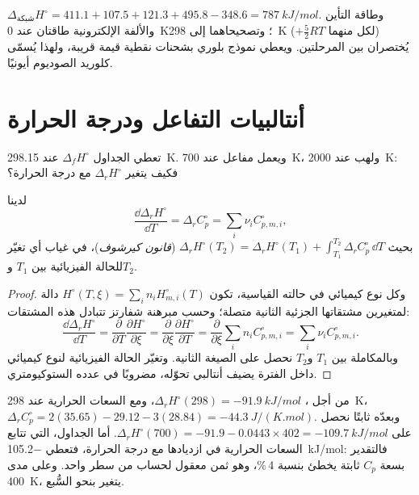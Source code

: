 \begin{example}\label{ex:b2:reaction-enthalpy:nacl}
$\Delta_{\text{شبكة}}H^\circ = 411.1 + 107.5 + 121.3 + 495.8 - 348.6 =
\qty{787}{kJ/mol}$. وطاقة التأين والألفة الإلكترونية طاقتان عند
\qty{0}{K}؛ وتصحيحاهما إلى \qty{298}{K} ($+\tfrac52RT$ لكل منهما)
يُختصران بين المرحلتين. ويعطي نموذج بلوري بشحنات نقطية قيمة قريبة، ولهذا
يُسمّى كلوريد الصوديوم أيونيًا.
\end{example}

\section{أنتالبيات التفاعل ودرجة الحرارة}

تعطي الجداول $\Delta_f H^\circ$ عند \qty{298.15}{K}. ويعمل مفاعل عند
\qty{700}{K}، ولهب عند \qty{2000}{K}: فكيف يتغير $\Delta_r H^\circ$ مع
درجة الحرارة؟

\begin{theorem}\label{thm:b2:reaction-enthalpy:kirchhoff}
لدينا
\[
  \frac{\dd\Delta_r H^\circ}{\dd T} = \Delta_r C_p^\circ =
  \sum_i\nu_i C_{p,m,i}^\circ ,
\]
بحيث $\Delta_r H^\circ(T_2) = \Delta_r H^\circ(T_1) + \int_{T_1}^{T_2}
\Delta_r C_p^\circ\,\dd T$ (\emph{قانون كيرشوف})،
في غياب أي تغيّر للحالة الفيزيائية بين $T_1$ و$T_2$.
\end{theorem}

\begin{proof}
وكل نوع كيميائي في حالته القياسية، تكون $H^\circ(T, \xi) = \sum_in_i
H^\circ_{m,i}(T)$ دالة لمتغيرين مشتقاتها الجزئية الثانية متصلة؛ وحسب
مبرهنة شفارتز تتبادل هذه المشتقات:
\[
  \frac{\dd\Delta_r H^\circ}{\dd T} = \frac{\partial}{\partial T}
  \frac{\partial H^\circ}{\partial\xi} = \frac{\partial}{\partial\xi}
  \frac{\partial H^\circ}{\partial T} = \frac{\partial}{\partial\xi}
  \sum_in_iC^\circ_{p,m,i} = \sum_i\nu_iC^\circ_{p,m,i}.
\]
وبالمكاملة بين $T_1$ و$T_2$ نحصل على الصيغة الثانية. وتغيّر الحالة
الفيزيائية لنوع كيميائي داخل الفترة يضيف أنتالبي تحوّله، مضروبًا في
عدده الستوكيومتري.
\end{proof}

\begin{example}\label{ex:b2:reaction-enthalpy:kirchhoff}
من أجل ، $\Delta_r H^\circ(298) =
\qty{-91.9}{kJ/mol}$، ومع السعات الحرارية عند \qty{298}{K}،
$\Delta_r C_p^\circ = 2(35.65) - 29.12 - 3(28.84) =
\qty{-44.3}{J/(K.mol)}$. وبعدّه ثابتًا نحصل على $\Delta_r
H^\circ(700) = -91.9 - 0.0443 \times 402 = \qty{-109.7}{kJ/mol}$. أما
الجداول، التي تتابع السعات الحرارية في ازديادها مع درجة الحرارة، فتعطي
\qty{-105.2}{kJ/mol}: فالتقدير بسعة $C_p$ ثابتة يخطئ بنسبة 4\,\%، وهو ثمن
معقول لحساب من سطر واحد. وعلى مدى \qty{400}{K}، يتغير 
بنحو السُّبع.
\end{example}

